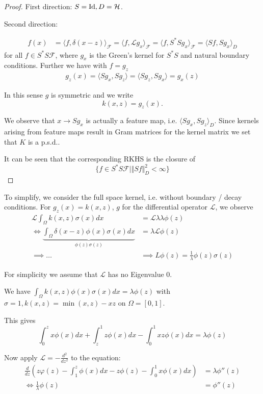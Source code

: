 \begin{proof}
    First direction: $S=\text{Id},D=\mathcal{H}$.

    Second direction: 

    \begin{align*}
        f(x)&=\langle f,\delta(x-z)\rangle_{\mathcal{F}}=\langle f,\mathcal{L} g_x\rangle_{\mathcal{F}}=\langle f, S^*S g_{x}\rangle_{\mathcal{F}}=\langle Sf,Sg_x\rangle_{D}
    \end{align*}
    for all $f\in S^*S\mathcal{F}$, where $g_x$ is the Green's kernel for 
    $S^*S$ and natural boundary conditions. Further we have with $f=g_z$
    \begin{align*}
        g_z(x)=\langle S g_x, Sg_z\rangle=\langle S g_z, S g_x\rangle=g_x(z)
    \end{align*}

    In this sense $g$ is symmetric and we write 
    \[k(x,z)=g_z(x).\]

    We observe that $x\to S g_x$ is actually a feature map,
    i.e. $\langle S g_x,S g_z\rangle_D$. Since kernels
    arising from feature maps result in Gram matrices for the kernel matrix 
    we set that $K$ is a p.s.d..

    It can be seen that the corresponding RKHS is the closure of 
    \[\{f\in S^* S\mathcal{F}\mid \Vert Sf\Vert_D^2 <\infty\}\]

\end{proof}

To simplify, we consider the full space kernel, i.e. 
without boundary  / decay conditions. For $g_z(x)=k(x,z)$, $g$ for the differential operator
$\mathcal{L}$, we observe 
\begin{align*}
    \mathcal{L}\int_\Omega k(x,z)\sigma(x) dx&=\mathcal{L}\lambda\lambda \phi(z)\\
    \iff \underbrace{\int_\Omega \delta(x-z)\phi(x)\sigma(x)dx}_{\phi(z)\sigma(z)}&=\lambda\mathcal{L}\phi(z)\\
    \implies \dots & \implies L\phi(z)=\frac{1}{\lambda}\phi(z)\sigma(z)
\end{align*}

For simplicity we assume that $\mathcal{L}$ has no Eigenvalue $0$.

\begin{example}
    We have $\int_\Omega k(x,z)\phi(x)\sigma(x)dx=\lambda\phi(z)$
    with $\sigma=1,k(x,z)=\min(x,z)-xz$ on $\Omega=[0,1]$.

    This gives
    \[\int_0^z x\phi(x)dx+\int_z^1 z\phi(x)dx-\int_0^1 xz\phi(x)dx=\lambda\phi(z)\]

    Now apply $\mathcal{L}=-\frac{d^2}{dz^2}$ to the equation:
    \begin{align*}
        \frac{d}{dz}\left(z\varphi(z)-\int_1^z \phi(x)dx-z\phi(z)-\int_0^1x\phi(x)dx\right)&=\lambda \phi''(z)\\
        \iff \frac{1}{\lambda}\phi(z)&=\phi''(z)
    \end{align*}

\end{example}


